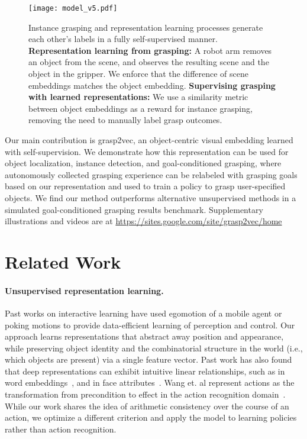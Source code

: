 \documentclass{article}
\begin{document}
\begin{figure}[t]
\centering
\vspace{-0.05in}
\texttt{[image: model\_v5.pdf]}
\caption{Instance grasping and representation learning processes generate each other's labels in a fully self-supervised manner. \textbf{Representation learning from grasping:} A robot arm removes an object from the scene, and observes the resulting scene and the object in the gripper. We enforce that the difference of scene embeddings matches the object embedding. \textbf{Supervising grasping with learned representations:} We use a similarity metric between object embeddings as a reward for instance grasping, removing the need to manually label grasp outcomes.}

\label{fig:method_schematic}
\vspace{-0.2in}
\end{figure}

Our main contribution is grasp2vec, an object-centric visual embedding learned with self-supervision. We demonstrate how this representation can be used for object localization, instance detection, and goal-conditioned grasping, where autonomously collected grasping experience can be relabeled with grasping goals based on our representation and used to train a policy to grasp user-specified objects. We find our method outperforms alternative unsupervised methods  in a simulated goal-conditioned grasping results benchmark. Supplementary illustrations and videos are at \url{https://sites.google.com/site/grasp2vec/home}
\section{Related Work}

\paragraph{Unsupervised representation learning.}
Past works on interactive learning have used egomotion of a mobile agent or poking motions \cite{agrawal2016learning, ebert2017self, pinto2016curious, jayaraman2015learning, jonschkowski2015learning}
to provide data-efficient learning of perception and control. Our approach learns representations that abstract away position and appearance, while preserving object identity and the combinatorial structure in the world (i.e., which objects are present) via a single feature vector. Past work has also found that deep representations can exhibit intuitive linear relationships, such as in word embeddings~\cite{mikolov2013distributed}, and in face attributes~\cite{radford2015unsupervised}. Wang et. al represent actions as the transformation from precondition to effect in the action recognition domain~\cite{wang2016actions}. While our work shares the idea of arithmetic consistency over the course of an action, we optimize a different criterion and apply the model to learning policies rather than action recognition.
\end{document}
